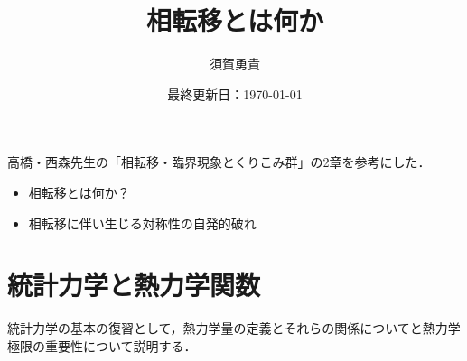 \documentclass[a4paper,11pt]{jsarticle}
\begin{document}
\title{相転移とは何か}
\author{須賀勇貴}
\date{最終更新日：\today}
\maketitle
高橋・西森先生の「相転移・臨界現象とくりこみ群」の2章を参考にした．
\vspace{0.5cm}

\begin{itemize}
  \item 相転移とは何か？
  \item 相転移に伴い生じる対称性の自発的破れ
\end{itemize}

\section{統計力学と熱力学関数}
統計力学の基本の復習として，熱力学量の定義とそれらの関係についてと熱力学極限の重要性について説明する．
\end{document}
